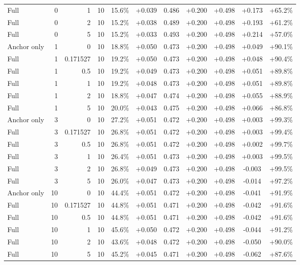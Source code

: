 \begin{table}[htbp]
\begin{tabular}{lrrrccccccc}
Full & 0 & 1 & 10 & 15.6\% & +0.039 & 0.486 & +0.200 & +0.498 & +0.173 & +65.2\% \\
Full & 0 & 2 & 10 & 15.2\% & +0.038 & 0.489 & +0.200 & +0.498 & +0.193 & +61.2\% \\
Full & 0 & 5 & 10 & 15.2\% & +0.033 & 0.493 & +0.200 & +0.498 & +0.214 & +57.0\% \\
Anchor only & 1 & 0 & 10 & 18.8\% & +0.050 & 0.473 & +0.200 & +0.498 & +0.049 & +90.1\% \\
Full & 1 & 0.171527 & 10 & 19.2\% & +0.050 & 0.473 & +0.200 & +0.498 & +0.048 & +90.4\% \\
Full & 1 & 0.5 & 10 & 19.2\% & +0.049 & 0.473 & +0.200 & +0.498 & +0.051 & +89.8\% \\
Full & 1 & 1 & 10 & 19.2\% & +0.048 & 0.473 & +0.200 & +0.498 & +0.051 & +89.8\% \\
Full & 1 & 2 & 10 & 18.8\% & +0.047 & 0.474 & +0.200 & +0.498 & +0.055 & +88.9\% \\
Full & 1 & 5 & 10 & 20.0\% & +0.043 & 0.475 & +0.200 & +0.498 & +0.066 & +86.8\% \\
Anchor only & 3 & 0 & 10 & 27.2\% & +0.051 & 0.472 & +0.200 & +0.498 & +0.003 & +99.3\% \\
Full & 3 & 0.171527 & 10 & 26.8\% & +0.051 & 0.472 & +0.200 & +0.498 & +0.003 & +99.4\% \\
Full & 3 & 0.5 & 10 & 26.8\% & +0.051 & 0.472 & +0.200 & +0.498 & +0.002 & +99.7\% \\
Full & 3 & 1 & 10 & 26.4\% & +0.051 & 0.473 & +0.200 & +0.498 & +0.003 & +99.5\% \\
Full & 3 & 2 & 10 & 26.8\% & +0.049 & 0.473 & +0.200 & +0.498 & -0.003 & +99.5\% \\
Full & 3 & 5 & 10 & 26.0\% & +0.047 & 0.473 & +0.200 & +0.498 & -0.014 & +97.2\% \\
Anchor only & 10 & 0 & 10 & 44.4\% & +0.051 & 0.472 & +0.200 & +0.498 & -0.041 & +91.9\% \\
Full & 10 & 0.171527 & 10 & 44.8\% & +0.051 & 0.471 & +0.200 & +0.498 & -0.042 & +91.6\% \\
Full & 10 & 0.5 & 10 & 44.8\% & +0.051 & 0.471 & +0.200 & +0.498 & -0.042 & +91.6\% \\
Full & 10 & 1 & 10 & 45.6\% & +0.050 & 0.472 & +0.200 & +0.498 & -0.044 & +91.2\% \\
Full & 10 & 2 & 10 & 43.6\% & +0.048 & 0.472 & +0.200 & +0.498 & -0.050 & +90.0\% \\
Full & 10 & 5 & 10 & 45.2\% & +0.045 & 0.471 & +0.200 & +0.498 & -0.062 & +87.6\% \\

\end{tabular}
\end{table}
